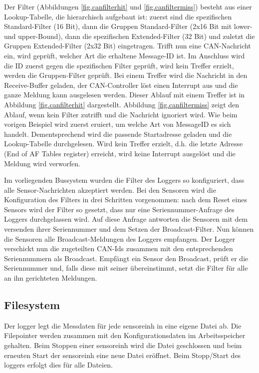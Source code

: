 Der Filter (Abbildungen \ref{fig.canfilterhit} und \ref{fig.canfiltermiss}) besteht aus einer Lookup-Tabelle, die hierarchisch aufgebaut ist: zuerst sind die spezifischen Standard-Filter (16 Bit), dann die Gruppen Standard-Filter (2x16 Bit mit lower- und upper-Bound), dann die spezifischen Extended-Filter (32 Bit) und zuletzt die Gruppen Extended-Filter (2x32 Bit) eingetragen. Trifft nun eine CAN-Nachricht ein, wird geprüft, welcher Art die erhaltene Message-ID ist. Im Anschluss wird die ID zuerst gegen die spezifischen Filter geprüft, wird kein Treffer erzielt, werden die Gruppen-Filter geprüft. Bei einem Treffer wird die Nachricht in den Receive-Buffer geladen, der CAN-Controller löst einen Interrupt aus und die ganze Meldung kann ausgelesen werden. Dieser Ablauf mit einem Treffer ist in Abbildung \ref{fig.canfilterhit} dargestellt. Abbildung \ref{fig.canfiltermiss} zeigt den Ablauf, wenn kein Filter zutrifft und die Nachricht ignoriert wird. Wie beim vorigen Beispiel wird zuerst eruiert, um welche Art von MessageID es sich handelt. Dementsprechend wird die passende Startadresse geladen und die Lookup-Tabelle durchgelesen. Wird kein Treffer erzielt, d.h. die letzte Adresse (End of AF Tables register) erreicht, wird keine Interrupt ausgelöst und die Meldung wird verworfen.

Im vorliegenden Bussystem wurden die Filter des Loggers so konfiguriert, dass alle Sensor-Nachrichten akzeptiert werden. Bei den Sensoren wird die Konfiguration des Filters in drei Schritten vorgenommen: nach dem Reset eines Sensors wird der Filter so gesetzt, dass nur eine Seriennummer-Anfrage des Loggers durchgelassen wird. Auf diese Anfrage antworten die Sensoren mit dem versenden ihrer Seriennummer und dem Setzen der Broadcast-Filter. Nun können die Sensoren alle Broadcast-Meldungen des Loggers empfangen. Der Logger verschickt nun die zugeteilten CAN-Ids zusammen mit den entsprechenden Seriennummern als Broadcast. Empfängt ein Sensor den Broadcast, prüft er die Seriennummer und, falls diese mit seiner übereinstimmt, setzt die Filter für alle an ihn gerichteten Meldungen.

\subsection{Filesystem}\label{subsec.sw_filesystem}
Der \gls{logger} legt die Messdaten für jede \gls{sensoreinh} in eine eigene Datei ab. Die Filepointer werden zusammen mit den Konfigurationsdaten im Arbeitsspeicher gehalten. Beim Stoppen einer \gls{sensoreinh} wird die Datei geschlossen und beim erneuten Start der \gls{sensoreinh} eine neue Datei eröffnet. Beim Stopp/Start des \gls{logger}s erfolgt dies für alle Dateien.

